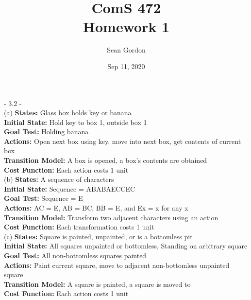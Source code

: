 \documentclass[12pt]{article}
\title{ComS 472\\Homework 1}
\author{Sean Gordon}
\date{Sep 11, 2020}
\begin{document}
\maketitle

- 3.2 - \\

(a) \textbf{States:} 			Glass box holds key or banana\\
\indent\indent \textbf{Initial State:}		Hold key to box 1, outside box 1\\
\indent\indent \textbf{Goal Test:	}		Holding banana\\
\indent\indent \textbf{Actions:}			Open next box using key, move into next box, get contents of current box\\
\indent\indent \textbf{Transition Model:}	A box is opened, a box's contents are obtained\\
\indent\indent \textbf{Cost Function:}		Each action costs 1 unit\\

(b) \textbf{States:}				A sequence of characters\\
\indent\indent \textbf{Initial State:}		Sequence = ABABAECCEC\\
\indent\indent \textbf{Goal Test:	}		Sequence = E\\
\indent\indent \textbf{Actions:}			AC = E, AB = BC, BB = E, and Ex = x for any x\\
\indent\indent \textbf{Transition Model:}	Transform two adjacent characters using an action\\
\indent\indent \textbf{Cost Function:}		Each transformation costs 1 unit\\

(c) \textbf{States:}				Square is painted, unpainted, or is a bottomless pit\\
\indent\indent \textbf{Initial State:}		All squares unpainted or bottomless, Standing on arbitrary square\\
\indent\indent \textbf{Goal Test:	}		All non-bottomless squares painted\\
\indent\indent \textbf{Actions:}			Paint current square, move to adjacent non-bottomless unpainted square\\
\indent\indent \textbf{Transition Model:}	A square is painted, a square is moved to\\
\indent\indent \textbf{Cost Function:}		Each action costs 1 unit\\
\end{document}
